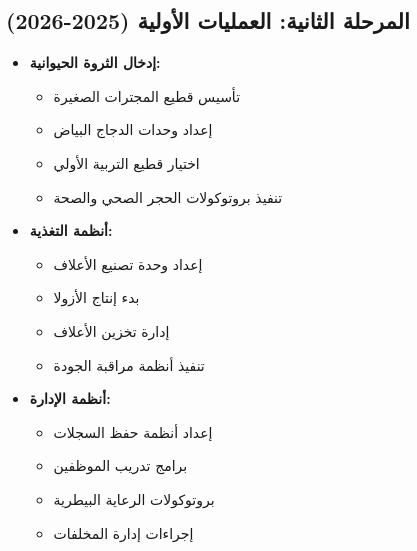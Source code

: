 \subsection{المرحلة الثانية: العمليات الأولية (2025-2026)}
\begin{itemize}
    \item \textbf{إدخال الثروة الحيوانية:}
    \begin{itemize}
        \item تأسيس قطيع المجترات الصغيرة
        \item إعداد وحدات الدجاج البياض
        \item اختيار قطيع التربية الأولي
        \item تنفيذ بروتوكولات الحجر الصحي والصحة
    \end{itemize}
    
    \item \textbf{أنظمة التغذية:}
    \begin{itemize}
        \item إعداد وحدة تصنيع الأعلاف
        \item بدء إنتاج الأزولا
        \item إدارة تخزين الأعلاف
        \item تنفيذ أنظمة مراقبة الجودة
    \end{itemize}
    
    \item \textbf{أنظمة الإدارة:}
    \begin{itemize}
        \item إعداد أنظمة حفظ السجلات
        \item برامج تدريب الموظفين
        \item بروتوكولات الرعاية البيطرية
        \item إجراءات إدارة المخلفات
    \end{itemize}
\end{itemize}

